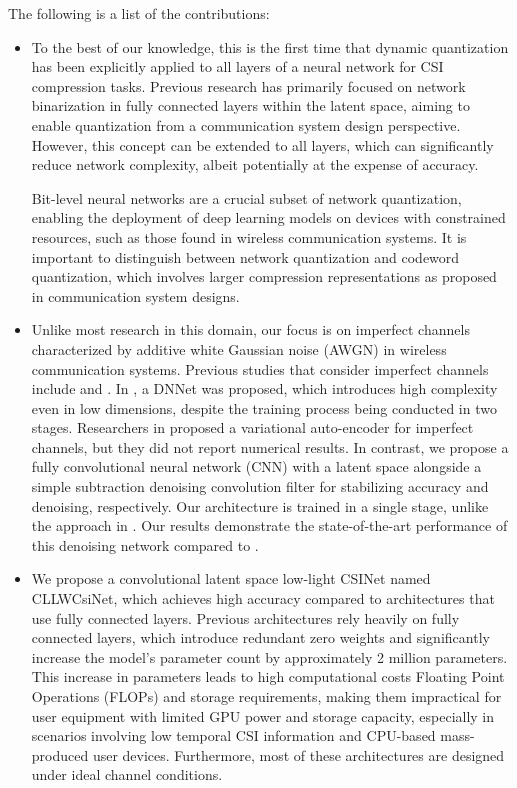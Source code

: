 \documentclass[lettersize,journal]{IEEEtran}
\begin{document}
The following is a list of the contributions:

\begin{itemize}
	\item To the best of our knowledge, this is the first time that dynamic quantization has been explicitly applied to all layers of a neural network for CSI compression tasks. Previous research has primarily focused on network binarization in fully connected layers within the latent space, aiming to enable quantization from a communication system design perspective. However, this concept can be extended to all layers, which can significantly reduce network complexity, albeit potentially at the expense of accuracy.
	
	Bit-level neural networks are a crucial subset of network quantization, enabling the deployment of deep learning models on devices with constrained resources, such as those found in wireless communication systems. It is important to distinguish between network quantization and codeword quantization, which involves larger compression representations as proposed in communication system designs.
	
	
	\item Unlike most research in this domain, our focus is on imperfect channels characterized by additive white Gaussian noise (AWGN) in wireless communication systems. Previous studies that consider imperfect channels include \cite{abw} and \cite{abs}. In \cite{abw}, a DNNet was proposed, which introduces high complexity even in low dimensions, despite the training process being conducted in two stages. Researchers in \cite{abs} proposed a variational auto-encoder for imperfect channels, but they did not report numerical results. In contrast, we propose a fully convolutional neural network (CNN) with a latent space alongside a simple subtraction denoising convolution filter for stabilizing accuracy and denoising, respectively. Our architecture is trained in a single stage, unlike the approach in \cite{abw}. Our results demonstrate the state-of-the-art performance of this denoising network compared to \cite{abw}.
	
	\item We propose a convolutional latent space low-light CSINet named CLLWCsiNet, which achieves high accuracy compared to architectures that use fully connected layers. Previous architectures rely heavily on fully connected layers, which introduce redundant zero weights and significantly increase the model's parameter count by approximately 2 million parameters. This increase in parameters leads to high computational costs Floating Point Operations (FLOPs) and storage requirements, making them impractical for user equipment with limited GPU power and storage capacity, especially in scenarios involving low temporal CSI information and CPU-based mass-produced user devices. Furthermore, most of these architectures are designed under ideal channel conditions.

	
	
	
\end{itemize}
\end{document}
